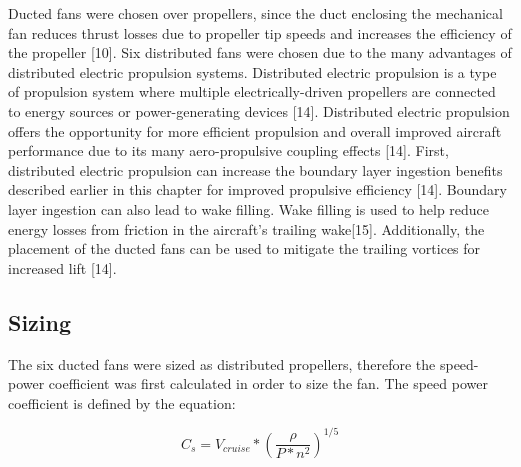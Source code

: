 \documentclass{article}
\begin{document}
Ducted fans were chosen over propellers, since the duct enclosing the mechanical fan reduces thrust losses due to propeller tip speeds and increases the efficiency of the propeller [10]. Six distributed fans were chosen due to the many advantages of distributed electric propulsion systems. Distributed electric propulsion is a type of propulsion system where multiple electrically-driven propellers are connected to energy sources or power-generating devices [14]. Distributed electric propulsion offers the opportunity for more efficient propulsion and overall improved aircraft performance due to its many aero-propulsive coupling effects [14]. First, distributed electric propulsion can increase the boundary layer ingestion benefits described earlier in this chapter for improved propulsive efficiency [14]. Boundary layer ingestion can also lead to wake filling. Wake filling is used to help reduce energy losses from friction in the aircraft's trailing wake[15]. Additionally, the placement of the ducted fans can be used to mitigate the trailing vortices for increased lift [14].   


\subsection{Sizing}
The six ducted fans were sized as distributed propellers, therefore the speed-power coefficient was first calculated in order to size the fan. The speed power coefficient is defined by the equation: 

\begin{equation}
C_{s} = V_{cruise} * (\frac{\rho}{P*n^{2}})^{1/5}
\end{equation}
\end{document}
